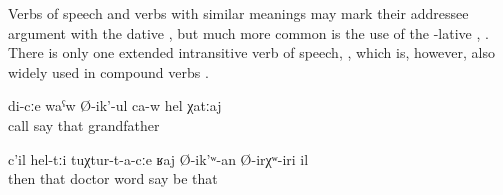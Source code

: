 Verbs of speech and verbs with similar meanings may mark their addressee argument with the dative , but much more common is the use of the -lative , . There is only one extended intransitive verb of speech,  , which is, however, also widely used in compound verbs .
%
\begin{exe}
	\ex	\label{ex:verbs of speech}
	\begin{xlist}
		\ex	{} 
		\ex	{} 
		\ex	{} 
		\ex	{} 
		\ex	{} 
		\ex	{} 
	\end{xlist}

	\ex	\label{ex:The grandfather is calling me@27a}
	\gll	di-cːe	waˁw	Ø-ik'-ul	ca-w	hel	χatːaj\\
			call	say		that	grandfather\\
	\glt	{}

	\ex	\label{ex:He was the one who was talking to the doctors}
	\gll	c'il	hel-tːi	tuχtur-t-a-cːe	ʁaj	Ø-ik'ʷ-an	Ø-irχʷ-iri	il\\
		then	that	doctor	word	\tsc{m-}say be	that\\
	\glt	{} 
\end{exe}

